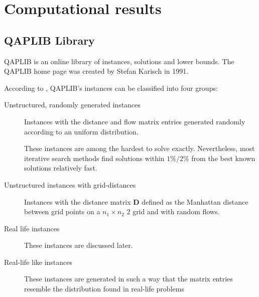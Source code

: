 \chapter{Computational results}
\label{chap:Computational_results}

\section{QAPLIB Library}
\label{sec:QAPLIB}
QAPLIB \cite{QAPLIB} is an online library of instances, solutions and lower bounds.
The QAPLIB home page was created by Stefan Karisch in 1991.

According to \cite{Taillard1995}, QAPLIB's instances can be classified into four groups:

\begin{description}
	\item[Unstructured, randomly generated instances]Instances with the distance and
	flow matrix entries generated randomly according to an uniform distribution.
	
	These instances are among the
	hardest to solve exactly. Nevertheless, most iterative search methods find solutions within $1\%/2\%$ from the best known solutions relatively fast.
	\item[Unstructured instances with grid-distances]Instances with the distance matrix $\bm D$
	defined as the Manhattan distance between grid points on a $n_1 \times n_2$ 2 grid and with random flows.
	\item[Real life instances] These instances are discussed later.
	\item[Real-life like instances] These instances are generated in such a way that the matrix
	entries resemble the distribution found in real-life problems

\end{description}

